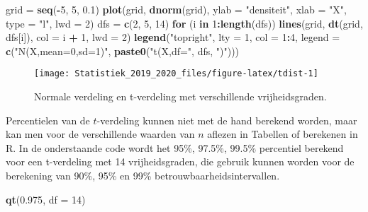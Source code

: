 \documentclass[12pt,dutch,coursenotes]{book}
\newenvironment{Shaded}{\begin{snugshade}}{\end{snugshade}}
\newcommand{\KeywordTok}[1]{\textcolor[rgb]{0.13,0.29,0.53}{\textbf{#1}}}
\newcommand{\DataTypeTok}[1]{\textcolor[rgb]{0.13,0.29,0.53}{#1}}
\newcommand{\DecValTok}[1]{\textcolor[rgb]{0.00,0.00,0.81}{#1}}
\newcommand{\FloatTok}[1]{\textcolor[rgb]{0.00,0.00,0.81}{#1}}
\newcommand{\StringTok}[1]{\textcolor[rgb]{0.31,0.60,0.02}{#1}}
\newcommand{\ControlFlowTok}[1]{\textcolor[rgb]{0.13,0.29,0.53}{\textbf{#1}}}
\newcommand{\OperatorTok}[1]{\textcolor[rgb]{0.81,0.36,0.00}{\textbf{#1}}}
\newcommand{\NormalTok}[1]{#1}
\theoremstyle{definition}
\theoremstyle{definition}
\theoremstyle{definition}
\theoremstyle{remark}
\begin{document}
\begin{Shaded}
\begin{Highlighting}[]
\NormalTok{grid =}\StringTok{ }\KeywordTok{seq}\NormalTok{(}\OperatorTok{-}\DecValTok{5}\NormalTok{, }\DecValTok{5}\NormalTok{, }\FloatTok{0.1}\NormalTok{)}
\KeywordTok{plot}\NormalTok{(grid, }\KeywordTok{dnorm}\NormalTok{(grid), }\DataTypeTok{ylab =} \StringTok{"densiteit"}\NormalTok{, }\DataTypeTok{xlab =} \StringTok{"X"}\NormalTok{, }
    \DataTypeTok{type =} \StringTok{"l"}\NormalTok{, }\DataTypeTok{lwd =} \DecValTok{2}\NormalTok{)}
\NormalTok{dfs =}\StringTok{ }\KeywordTok{c}\NormalTok{(}\DecValTok{2}\NormalTok{, }\DecValTok{5}\NormalTok{, }\DecValTok{14}\NormalTok{)}
\ControlFlowTok{for}\NormalTok{ (i }\ControlFlowTok{in} \DecValTok{1}\OperatorTok{:}\KeywordTok{length}\NormalTok{(dfs)) }\KeywordTok{lines}\NormalTok{(grid, }\KeywordTok{dt}\NormalTok{(grid, dfs[i]), }
    \DataTypeTok{col =}\NormalTok{ i }\OperatorTok{+}\StringTok{ }\DecValTok{1}\NormalTok{, }\DataTypeTok{lwd =} \DecValTok{2}\NormalTok{)}
\KeywordTok{legend}\NormalTok{(}\StringTok{"topright"}\NormalTok{, }\DataTypeTok{lty =} \DecValTok{1}\NormalTok{, }\DataTypeTok{col =} \DecValTok{1}\OperatorTok{:}\DecValTok{4}\NormalTok{, }\DataTypeTok{legend =} \KeywordTok{c}\NormalTok{(}\StringTok{"N(X,mean=0,sd=1)"}\NormalTok{, }
    \KeywordTok{paste0}\NormalTok{(}\StringTok{"t(X,df="}\NormalTok{, dfs, }\StringTok{")"}\NormalTok{)))}
\end{Highlighting}
\end{Shaded}

\begin{figure}

{\centering \texttt{[image: Statistiek\_2019\_2020\_files/figure-latex/tdist-1]} 

}

\caption{Normale verdeling en t-verdeling met verschillende vrijheidsgraden.}\label{fig:tdist}
\end{figure}

Percentielen van de \(t\)-verdeling kunnen niet met de hand berekend
worden, maar kan men voor de verschillende waarden van \(n\) aflezen in
Tabellen of berekenen in R. In de onderstaande code wordt het 95\%,
97.5\%, 99.5\% percentiel berekend voor een t-verdeling met 14
vrijheidsgraden, die gebruik kunnen worden voor de berekening van 90\%,
95\% en 99\% betrouwbaarheidsintervallen.

\begin{Shaded}
\begin{Highlighting}[]
\KeywordTok{qt}\NormalTok{(}\FloatTok{0.975}\NormalTok{, }\DataTypeTok{df =} \DecValTok{14}\NormalTok{)}
\end{Highlighting}
\end{Shaded}
\end{document}
